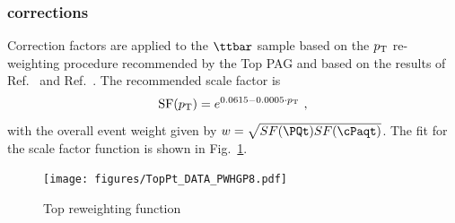 \subsubsection{\ttbar \pt corrections}
\label{sec:ttbarpt}
Correction factors are applied to the $\ttbar$ sample based on the $p_{\mathrm{T}}$
re-weighting procedure recommended by the Top PAG and based on the
results of Ref.~\cite{CMS-PAS-TOP-16-011} and Ref.~\cite{Khachatryan:2016mnb}. The recommended
scale factor is~\cite{CMS-TOP-PT-REWEIGHT}
\begin{equation}
\mathrm{SF}(p_{\mathrm{T}}) = e^{0.0615-0.0005\cdot p_{\mathrm{T}}}~,
\end{equation}
with the overall event weight given by
$w=\sqrt{SF(\PQt)SF(\cPaqt)}$. The fit for the scale factor function is shown in
Fig.~\ref{fig:topPt}. 
\begin{figure}[hbtp]\begin{center}
    \texttt{[image: figures/TopPt\_DATA\_PWHGP8.pdf]}
    \caption{Top \pt reweighting function}
 \label{fig:topPt}
 \end{center}
 \end{figure}
